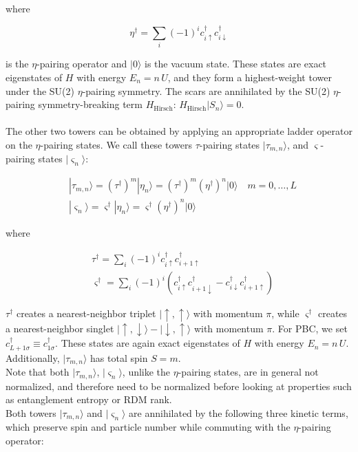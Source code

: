 \documentclass[11pt]{article}
\begin{document}
\begin{itemize}
\begin{itemize}
    where
    
    \begin{equation}
    \eta^\dag = \sum_i (-1)^i c^\dagger_{i\uparrow} c^\dagger_{i\downarrow}
    \end{equation}
    
     is the \(\eta\)-pairing operator and \( |0\rangle \) is the vacuum state. These states are exact eigenstates of \( H \) with energy \( E_n = n\,U \), and they form a highest-weight tower under the SU(2) \(\eta\)-pairing symmetry. The scars are annihilated by  	     the SU(2) \(\eta\)-pairing symmetry-breaking term $H_{\text{Hirsch}}$: $H_{\text{Hirsch}}|S_n\rangle  = 0$.\\
    \vspace{1mm}\\
    The other two towers can be obtained by applying an appropriate ladder operator on the $\eta$-pairing states. We call these towers \(\tau\)-pairing states $|\tau_{m,n}\rangle$, and \(\varsigma\)-pairing states $|\varsigma_n\rangle$:
    
    \begin{align}
    &|\tau_{m,n}\rangle = (\tau^\dag)^m |\eta_n\rangle = (\tau^\dag)^m (\eta^\dag)^n |0\rangle \quad m=0,\hdots,L \\
    &|\varsigma_n\rangle = \varsigma^\dag |\eta_n\rangle = \varsigma^\dag (\eta^\dag)^n |0\rangle 
    \end{align}

    where
    
    \begin{align}
    &\tau^\dag = \sum_i (-1)^i c^\dagger_{i\uparrow} c^\dagger_{i+1\uparrow}\\
    &\varsigma^\dag = \sum_i (-1)^i \left( c^\dagger_{i\uparrow} c^\dagger_{i+1\downarrow} - c^\dagger_{i\downarrow} c^\dagger_{i+1\uparrow} \right)
    \end{align}
    
    $\tau^\dagger$ creates a nearest-neighbor triplet $\lvert\uparrow, \uparrow\rangle$ with momentum $\pi$, while $\varsigma^\dagger$ creates a nearest-neighbor singlet $\lvert\uparrow, \downarrow\rangle - \lvert\downarrow, \uparrow\rangle$ with momentum $\pi$. For PBC, we set $c^\dagger_{L+1\sigma} \equiv c^\dagger_{1\sigma}$. These states are again exact eigenstates of \( H \) with energy \( E_n = n\,U \). Additionally, $|\tau_{m,n}\rangle$ has total spin $S=m$.\\
Note that both $|\tau_{m,n}\rangle$, $|\varsigma_n\rangle$, unlike the $\eta$-pairing states, are in general not normalized, and therefore need to be normalized before looking at properties such as entanglement entropy or RDM rank.\\
Both towers \( |\tau_{m,n}\rangle \) and \( |\varsigma_n\rangle \) are annihilated by the following three kinetic terms, which preserve spin and particle number while commuting with the \(\eta\)-pairing operator:


\end{itemize}
\end{itemize}
\end{document}
